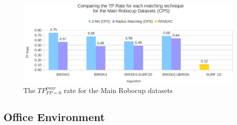 \documentclass[11pt]{report}
\begin{document}
\begin{figure}
  \centering
    \includegraphics[width=1.0\textwidth]{../Drawings/Graphs/tp_rate_mrb_cps.pdf}
    \caption{The $TP_{FP=0}^{max}$ rate for the Main Robocup datasets} 
    \label{app:tp_rate_mrd}
\end{figure}



\subsection{Office Environment}
\label{app:oe}
\end{document}
